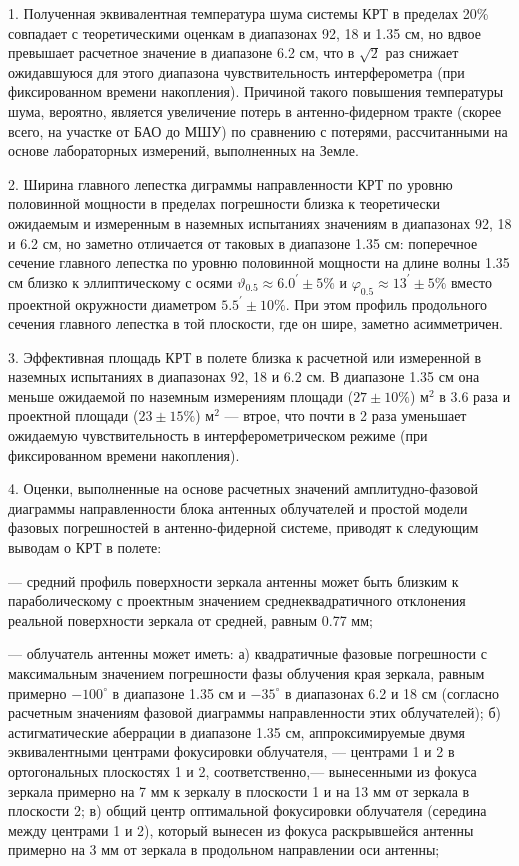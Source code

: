 1. Полученная эквивалентная температура шума системы КРТ в пределах 20\%
совпадает с теоретическими оценкам в диапазонах 92, 18 и 1.35 см,
но вдвое превышает расчетное значение в диапазоне 6.2 см, что
в $\sqrt 2$ раз снижает ожидавшуюся для этого диапазона
чувствительность интерферометра (при фиксированном времени накопления).
Причиной такого повышения температуры шума, вероятно, является увеличение потерь в
антенно-фидерном тракте (скорее всего, на участке от БАО до МШУ) по сравнению с
потерями, рассчитанными на основе лабораторных измерений, выполненных на Земле.


2. Ширина главного лепестка диграммы направленности КРТ по уровню половинной мощности
в пределах погрешности близка к теоретически ожидаемым
и измеренным в наземных испытаниях значениям в
диапазонах 92, 18 и 6.2 см,
но заметно отличается от таковых в диапазоне 1.35 см:
поперечное сечение главного лепестка по уровню половинной мощности
на длине волны 1.35 см близко к эллиптическому с осями
$\vartheta_{0.5} \approx 6.0^\prime \pm 5\%$ и
$\varphi_{0.5} \approx 13 ^\prime  \pm 5\%$
 вместо проектной окружности диаметром $5.5 ^\prime  \pm 10\%$.
При этом профиль продольного сечения главного лепестка в той плоскости,
где он шире, заметно асимметричен.

3. Эффективная площадь КРТ в полете близка к расчетной или измеренной в наземных
испытаниях в диапазонах 92, 18 и 6.2 см.
В диапазоне 1.35 см она меньше ожидаемой по наземным измерениям площади
($27 \pm 10\%$) м$^2$ в 3.6 раза и проектной площади ($23 \pm 15\%$) м$^2$ ---
втрое, что почти в 2 раза уменьшает ожидаемую чувствительность в
интерферометрическом режиме (при фиксированном времени накопления).

4. Оценки, выполненные на основе расчетных значений амплитудно-фазовой диаграммы
направленности блока антенных облучателей  и простой модели фазовых погрешностей
в антенно-фидерной системе, приводят к следующим выводам о КРТ в полете:

--- средний профиль поверхности зеркала антенны может быть близким к
 параболическому с проектным значением  среднеквадратичного отклонения
 реальной поверхности зеркала от средней, равным 0.77 мм;

---  облучатель антенны может иметь:
а) квадратичные фазовые погрешности с максимальным значением
погрешности фазы облучения края зеркала, равным примерно $-100^\circ$ в
диапазоне 1.35 см и $-35^\circ$ в диапазонах 6.2 и 18 см
(согласно расчетным значениям фазовой диаграммы направленности
этих облучателей);
б) астигматические аберрации в диапазоне 1.35 см, аппроксимируемые
двумя эквивалентными центрами фокусировки облучателя, --- центрами 1 и 2
в ортогональных плоскостях 1 и 2, соответственно,---
вынесенными из фокуса зеркала примерно на 7 мм к зеркалу в
плоскости 1 и на 13 мм от зеркала в плоскости 2;
в) общий центр оптимальной фокусировки облучателя
(середина между центрами 1 и 2), который вынесен из фокуса
раскрывшейся антенны примерно на 3 мм от
зеркала в продольном направлении оси антенны;

